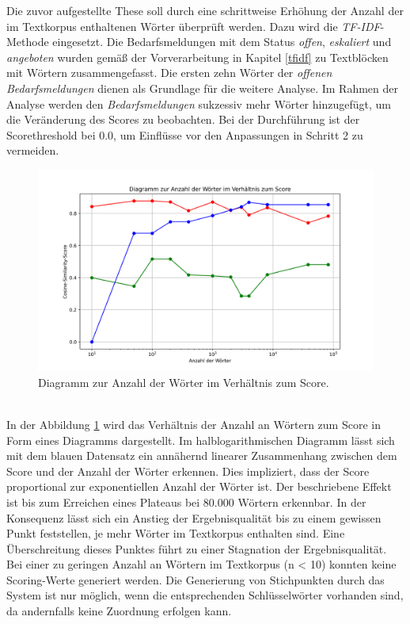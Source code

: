 Die zuvor aufgestellte These soll durch eine schrittweise Erhöhung der Anzahl der im Textkorpus enthaltenen Wörter überprüft werden. Dazu wird die \emph{TF-IDF}-Methode eingesetzt. Die Bedarfsmeldungen mit dem Status \emph{offen}, \emph{eskaliert} und \emph{angeboten} wurden gemäß der Vorverarbeitung in Kapitel \ref{tfidf} zu Textblöcken mit Wörtern zusammengefasst. Die ersten zehn Wörter der \emph{offenen Bedarfsmeldungen} dienen als Grundlage für die weitere Analyse. Im Rahmen der Analyse werden den \emph{Bedarfsmeldungen} sukzessiv mehr Wörter hinzugefügt, um die Veränderung des Scores zu beobachten. Bei der Durchführung ist der Scorethreshold bei 0.0, um Einflüsse vor den Anpassungen in Schritt 2 zu vermeiden.
\begin{figure}[H]
	\centering  
	\includegraphics[width=\linewidth]{plot/e1-woerter-score.png}
	\caption{Diagramm zur Anzahl der Wörter im Verhältnis zum Score.}
	\label{fig:woertervsscore}
\end{figure}\mbox{} \\
In der Abbildung \ref{fig:woertervsscore} wird das Verhältnis der Anzahl an Wörtern zum Score in Form eines Diagramms dargestellt. Im halblogarithmischen Diagramm lässt sich mit dem blauen Datensatz ein annähernd linearer Zusammenhang zwischen dem Score und der Anzahl der Wörter erkennen. Dies impliziert, dass der Score proportional zur exponentiellen Anzahl der Wörter ist. Der beschriebene Effekt ist bis zum Erreichen eines Plateaus bei 80.000 Wörtern erkennbar. In der Konsequenz lässt sich ein Anstieg der Ergebnisqualität bis zu einem gewissen Punkt feststellen, je mehr Wörter im Textkorpus enthalten sind. Eine Überschreitung dieses Punktes führt zu einer Stagnation der Ergebnisqualität. Bei einer zu geringen Anzahl an Wörtern im Textkorpus (n < 10) konnten keine Scoring-Werte generiert werden. Die Generierung von Stichpunkten durch das System ist nur möglich, wenn die entsprechenden Schlüsselwörter vorhanden sind, da andernfalls keine Zuordnung erfolgen kann.

